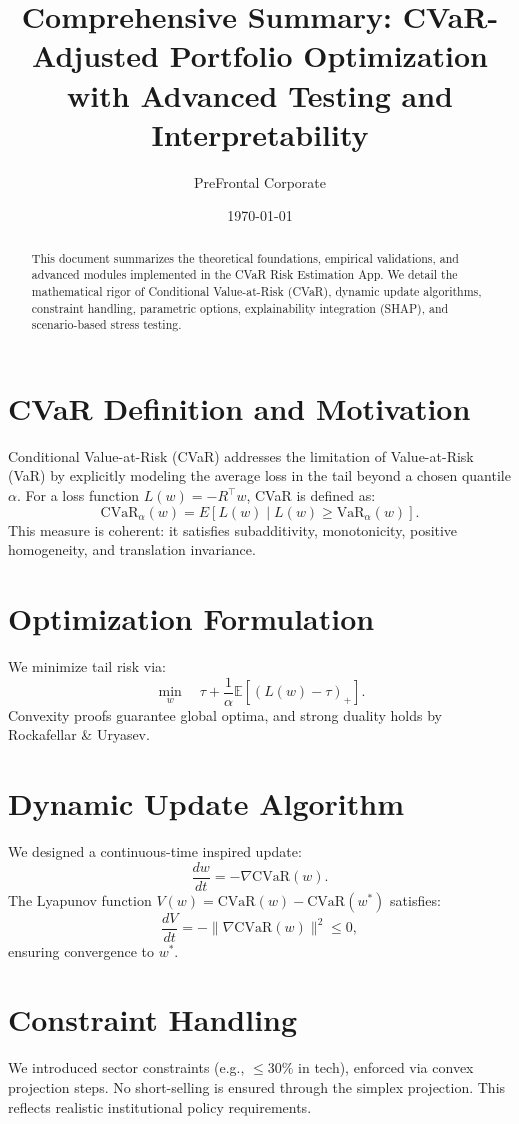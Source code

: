 \documentclass[12pt]{article}
\title{Comprehensive Summary: CVaR-Adjusted Portfolio Optimization with Advanced Testing and Interpretability}
\author{PreFrontal Corporate}
\date{\today}
\begin{document}
\maketitle

\begin{abstract}
This document summarizes the theoretical foundations, empirical validations, and advanced modules implemented in the CVaR Risk Estimation App. We detail the mathematical rigor of Conditional Value-at-Risk (CVaR), dynamic update algorithms, constraint handling, parametric options, explainability integration (SHAP), and scenario-based stress testing.
\end{abstract}

\section{CVaR Definition and Motivation}
Conditional Value-at-Risk (CVaR) addresses the limitation of Value-at-Risk (VaR) by explicitly modeling the average loss in the tail beyond a chosen quantile $\alpha$. For a loss function $L(w) = -R^\top w$, CVaR is defined as:
\[
\text{CVaR}_\alpha(w) = E[L(w) \mid L(w) \ge \text{VaR}_\alpha(w)].
\]
This measure is coherent: it satisfies subadditivity, monotonicity, positive homogeneity, and translation invariance.

\section{Optimization Formulation}
We minimize tail risk via:
\[
\min_{w} \quad \tau + \frac{1}{\alpha}\mathbb{E}[(L(w) - \tau)_+].
\]
Convexity proofs guarantee global optima, and strong duality holds by Rockafellar \& Uryasev.

\section{Dynamic Update Algorithm}
We designed a continuous-time inspired update:
\[
\frac{dw}{dt} = -\nabla \text{CVaR}(w).
\]
The Lyapunov function $V(w) = \text{CVaR}(w) - \text{CVaR}(w^*)$ satisfies:
\[
\frac{dV}{dt} = -\|\nabla \text{CVaR}(w)\|^2 \le 0,
\]
ensuring convergence to $w^*$.

\section{Constraint Handling}
We introduced sector constraints (e.g., $\le 30\%$ in tech), enforced via convex projection steps. No short-selling is ensured through the simplex projection. This reflects realistic institutional policy requirements.
\end{document}
